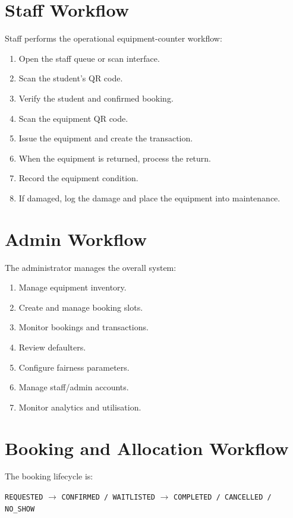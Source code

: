 \documentclass[12pt,a4paper,oneside]{report}
\begin{document}
\section{Staff Workflow}

Staff performs the operational equipment-counter workflow:

\begin{enumerate}
    \item Open the staff queue or scan interface.
    \item Scan the student's QR code.
    \item Verify the student and confirmed booking.
    \item Scan the equipment QR code.
    \item Issue the equipment and create the transaction.
    \item When the equipment is returned, process the return.
    \item Record the equipment condition.
    \item If damaged, log the damage and place the equipment into maintenance.
\end{enumerate}

\section{Admin Workflow}

The administrator manages the overall system:

\begin{enumerate}
    \item Manage equipment inventory.
    \item Create and manage booking slots.
    \item Monitor bookings and transactions.
    \item Review defaulters.
    \item Configure fairness parameters.
    \item Manage staff/admin accounts.
    \item Monitor analytics and utilisation.
\end{enumerate}

\section{Booking and Allocation Workflow}

The booking lifecycle is:

\begin{center}
\texttt{REQUESTED}
$\rightarrow$
\texttt{CONFIRMED / WAITLISTED}
$\rightarrow$
\texttt{COMPLETED / CANCELLED / NO\_SHOW}
\end{center}
\end{document}

